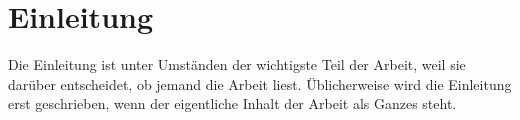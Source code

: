 
\chapter{Einleitung}
\label{chapter:introduction}

Die Einleitung ist unter Umständen der wichtigste Teil der Arbeit, weil sie darüber entscheidet, ob jemand die Arbeit liest. Üblicherweise wird die Einleitung erst geschrieben, wenn der eigentliche Inhalt der Arbeit als Ganzes steht.


